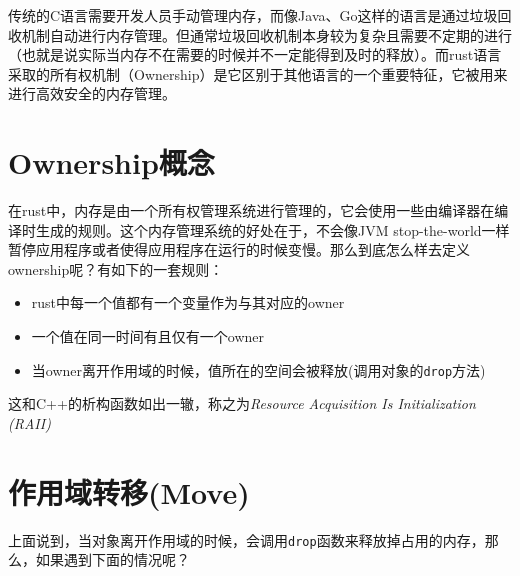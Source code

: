 \documentclass[12pt]{article}
\begin{document}
\makeblogtitle

传统的C语言需要开发人员手动管理内存，而像Java、Go这样的语言是通过垃圾回收机制自动进行内存管理。但通常垃圾回收机制本身较为复杂且需要不定期的进行（也就是说实际当内存不在需要的时候并不一定能得到及时的释放）。而rust语言采取的所有权机制（Ownership）是它区别于其他语言的一个重要特征，它被用来进行高效安全的内存管理。

\section{Ownership概念}\label{ownershipux6982ux5ff5}

在rust中，内存是由一个所有权管理系统进行管理的，它会使用一些由编译器在编译时生成的规则。这个内存管理系统的好处在于，不会像JVM stop-the-world一样暂停应用程序或者使得应用程序在运行的时候变慢。那么到底怎么样去定义ownership呢？有如下的一套规则：

\begin{itemize}
\tightlist
\item
  rust中每一个值都有一个变量作为与其对应的owner
\item
  一个值在同一时间有且仅有一个owner
\item
  当owner离开作用域的时候，值所在的空间会被释放(调用对象的\texttt{drop}方法)
\end{itemize}

这和C++的析构函数如出一辙，称之为\emph{Resource Acquisition Is Initialization (RAII)}

\begin{Shaded}
\begin{Highlighting}[]

\OperatorTok{\{}
    \OperatorTok{=} \PreprocessorTok{::}\NormalTok{)}\OperatorTok{;} 

\OperatorTok{\}}                                  
\end{Highlighting}
\end{Shaded}

\section{作用域转移(Move)}\label{ux4f5cux7528ux57dfux8f6cux79fbmove}

上面说到，当对象离开作用域的时候，会调用\texttt{drop}函数来释放掉占用的内存，那么，如果遇到下面的情况呢？
\end{document}
